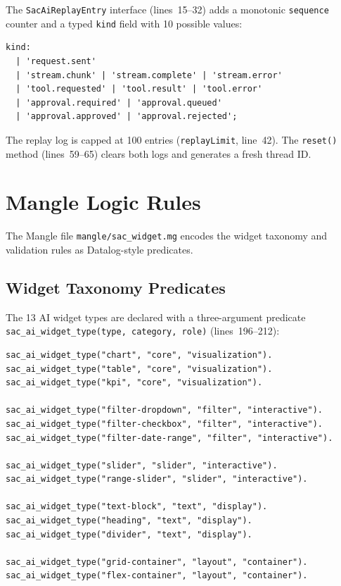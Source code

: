 \documentclass[11pt]{article}
\begin{document}
The \texttt{SacAiReplayEntry} interface (lines~15--32) adds a monotonic
\texttt{sequence} counter and a typed \texttt{kind} field with 10 possible
values:

\begin{lstlisting}[language={[Sharp]C},caption={Replay entry kinds (sac-ai-session.service.ts:19--31)}]
kind:
  | 'request.sent'
  | 'stream.chunk' | 'stream.complete' | 'stream.error'
  | 'tool.requested' | 'tool.result' | 'tool.error'
  | 'approval.required' | 'approval.queued'
  | 'approval.approved' | 'approval.rejected';
\end{lstlisting}

\noindent The replay log is capped at 100 entries (\texttt{replayLimit},
line~42). The \texttt{reset()} method (lines~59--65) clears both logs and
generates a fresh thread ID.

\section{Mangle Logic Rules}
\label{sec:mangle}

The Mangle file \texttt{mangle/sac\_widget.mg} encodes the widget taxonomy and
validation rules as Datalog-style predicates.

\subsection{Widget Taxonomy Predicates}

The 13 AI widget types are declared with a three-argument predicate
\texttt{sac\_ai\_widget\_type(type, category, role)} (lines~196--212):

\begin{lstlisting}[caption={Widget taxonomy facts (sac\_widget.mg:196--212)}]
sac_ai_widget_type("chart", "core", "visualization").
sac_ai_widget_type("table", "core", "visualization").
sac_ai_widget_type("kpi", "core", "visualization").

sac_ai_widget_type("filter-dropdown", "filter", "interactive").
sac_ai_widget_type("filter-checkbox", "filter", "interactive").
sac_ai_widget_type("filter-date-range", "filter", "interactive").

sac_ai_widget_type("slider", "slider", "interactive").
sac_ai_widget_type("range-slider", "slider", "interactive").

sac_ai_widget_type("text-block", "text", "display").
sac_ai_widget_type("heading", "text", "display").
sac_ai_widget_type("divider", "text", "display").

sac_ai_widget_type("grid-container", "layout", "container").
sac_ai_widget_type("flex-container", "layout", "container").
\end{lstlisting}
\end{document}
